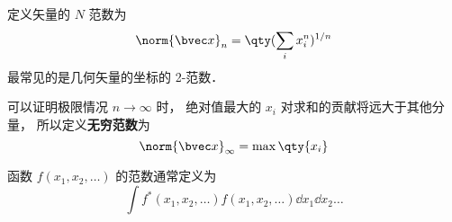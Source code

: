 
定义矢量的 $N$ 范数为
\begin{equation}
\norm{\bvec x}_n = \qty(\sum_i x_i^n)^{1/n}
\end{equation}
最常见的是几何矢量的坐标的 2-范数．
\begin{equation}

\end{equation}


可以证明极限情况 $n \to \infty$ 时， 绝对值最大的 $x_i$ 对求和的贡献将远大于其他分量， 所以定义\textbf{无穷范数}为
\begin{equation}
\norm{\bvec x}_\infty = \max \qty{x_i}
\end{equation}

函数 $f(x_1, x_2, \dots)$ 的范数通常定义为
\begin{equation}
\int f^*(x_1, x_2, \dots) f(x_1, x_2, \dots) \dd{x_1}\dd{x_2}\dots
\end{equation}
